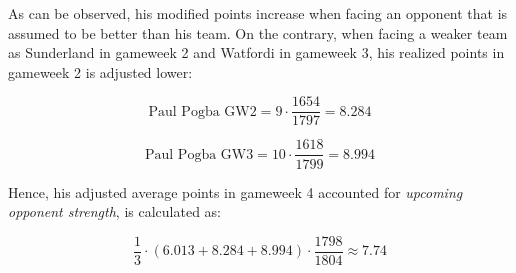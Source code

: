 As can be observed, his modified points increase when facing an opponent that is assumed to be better than his team. On the contrary, when facing a weaker team as Sunderland in gameweek 2 and Watfordi in gameweek 3, his realized points in gameweek 2 is adjusted lower: 

\begin{equation*}
    \textrm{Paul Pogba GW2} = 9 \cdot \frac{1654}{1797} = 8.284 
\end{equation*}


\begin{equation*}
    \textrm{Paul Pogba GW3} = 10 \cdot \frac{1618}{1799} = 8.994
\end{equation*}

Hence, his adjusted average points in gameweek 4 accounted for \textit{upcoming opponent strength}, is calculated as: 

\begin{equation*}
    \frac{1}{3} \cdot (6.013 + 8.284 + 8.994) \cdot \frac{1798}{1804} \approx 7.74 
\end{equation*}
